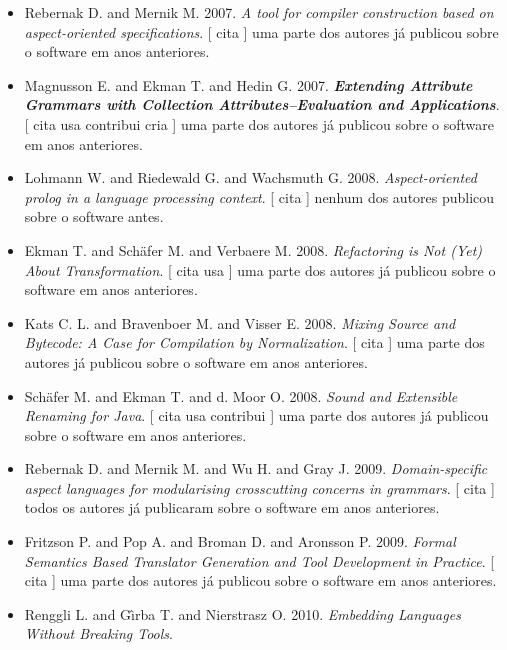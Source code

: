 \begin{itemize}
      [
          cita
          usa
      ]
nenhum dos autores publicou sobre o software antes.
\item Rebernak D. and Mernik M.
      2007.
        \textit{ A tool for compiler construction based on aspect-oriented specifications}.
      [
          cita
      ]
uma parte dos autores já publicou sobre o software em anos anteriores.
\item Magnusson E. and Ekman T. and Hedin G.
      2007.
        \textbf{\textit{ Extending Attribute Grammars with Collection Attributes--Evaluation and Applications}}.
      [
          cita
          usa
          contribui
          cria
      ]
uma parte dos autores já publicou sobre o software em anos anteriores.
\item Lohmann W. and Riedewald G. and Wachsmuth G.
      2008.
        \textit{ Aspect-oriented prolog in a language processing context}.
      [
          cita
      ]
nenhum dos autores publicou sobre o software antes.
\item Ekman T. and Sch\"{a}fer M. and Verbaere M.
      2008.
        \textit{ Refactoring is Not (Yet) About Transformation}.
      [
          cita
          usa
      ]
uma parte dos autores já publicou sobre o software em anos anteriores.
\item Kats C. L. and Bravenboer M. and Visser E.
      2008.
        \textit{ Mixing Source and Bytecode: A Case for Compilation by Normalization}.
      [
          cita
      ]
uma parte dos autores já publicou sobre o software em anos anteriores.
\item Sch\"{a}fer M. and Ekman T. and d. Moor O.
      2008.
        \textit{ Sound and Extensible Renaming for Java}.
      [
          cita
          usa
          contribui
      ]
uma parte dos autores já publicou sobre o software em anos anteriores.
\item Rebernak D. and Mernik M. and Wu H. and Gray J.
      2009.
        \textit{ Domain-specific aspect languages for modularising crosscutting concerns in grammars}.
      [
          cita
      ]
todos os autores já publicaram sobre o software em anos anteriores.
\item Fritzson P. and Pop A. and Broman D. and Aronsson P.
      2009.
        \textit{ Formal Semantics Based Translator Generation and Tool Development in Practice}.
      [
          cita
      ]
uma parte dos autores já publicou sobre o software em anos anteriores.
\item Renggli L. and G\^{\i}rba T. and Nierstrasz O.
      2010.
        \textit{ Embedding Languages Without Breaking Tools}.

\end{itemize}
